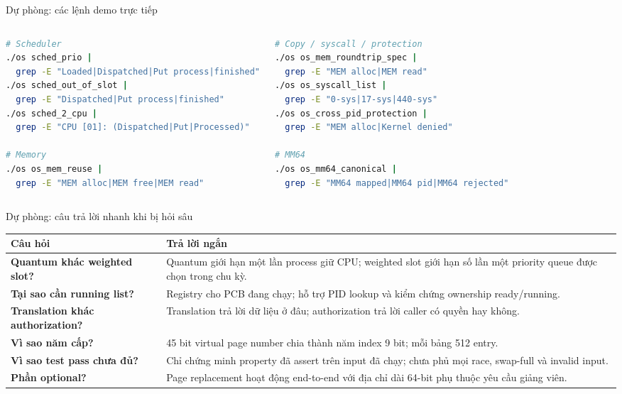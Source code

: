 \documentclass[aspectratio=169,11pt]{beamer}
\begin{document}
\appendix
\begin{frame}[fragile]{Dự phòng: các lệnh demo trực tiếp}
  \begin{columns}[T,onlytextwidth]
      \begin{lstlisting}[language=bash,basicstyle=\ttfamily\scriptsize]
# Scheduler
./os sched_prio |
  grep -E "Loaded|Dispatched|Put process|finished"
./os sched_out_of_slot |
  grep -E "Dispatched|Put process|finished"
./os sched_2_cpu |
  grep -E "CPU [01]: (Dispatched|Put|Processed)"

# Memory
./os os_mem_reuse |
  grep -E "MEM alloc|MEM free|MEM read"
      \end{lstlisting}
      \begin{lstlisting}[language=bash,basicstyle=\ttfamily\scriptsize]
# Copy / syscall / protection
./os os_mem_roundtrip_spec |
  grep -E "MEM alloc|MEM read"
./os os_syscall_list |
  grep -E "0-sys|17-sys|440-sys"
./os os_cross_pid_protection |
  grep -E "MEM alloc|Kernel denied"

# MM64
./os os_mm64_canonical |
  grep -E "MM64 mapped|MM64 pid|MM64 rejected"
      \end{lstlisting}
  \end{columns}
\end{frame}

\begin{frame}{Dự phòng: câu trả lời nhanh khi bị hỏi sâu}
  \scriptsize
  \renewcommand{\arraystretch}{1.2}
  \begin{tabular}{>{\bfseries}p{.28\linewidth}p{.65\linewidth}}
    \toprule
    Câu hỏi & Trả lời ngắn\\
    \midrule
    Quantum khác weighted slot? & Quantum giới hạn một lần process giữ CPU; weighted slot giới hạn số lần một priority queue được chọn trong chu kỳ.\\
    Tại sao cần running list? & Registry cho PCB đang chạy; hỗ trợ PID lookup và kiểm chứng ownership ready/running.\\
    Translation khác authorization? & Translation trả lời dữ liệu ở đâu; authorization trả lời caller có quyền hay không.\\
    Vì sao năm cấp? & 45 bit virtual page number chia thành năm index 9 bit; mỗi bảng 512 entry.\\
    Vì sao test pass chưa đủ? & Chỉ chứng minh property đã assert trên input đã chạy; chưa phủ mọi race, swap-full và invalid input.\\
    Phần optional? & Page replacement hoạt động end-to-end với địa chỉ dài 64-bit phụ thuộc yêu cầu giảng viên.\\
    \bottomrule
  \end{tabular}
\end{frame}
\end{document}
